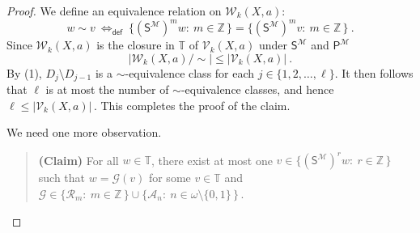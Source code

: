 \documentclass[10pt,a4paper, openany,  oldfontcommands]{memoir}
\newtheorem{open problem} [theorem] {Open Problem}
\newtheorem{open question} [theorem] {Open Question}
\renewcommand{\mathrm}{\mathsf}
\begin{document}
\begin{proof}
We define an equivalence relation on  $   \mathcal{W}_k   \left(     X,  a  \right)  $: 
\[
w  \sim  v  
\   \Leftrightarrow_{  \mathsf{def}  }    \   
\big\{  \left(  \mathrm{S}^{  \mathcal{M} }  \right)^m   w :   \   m  \in  \mathbb{Z} \,  \rbrace  
= 
\big\{  \left(  \mathrm{S}^{  \mathcal{M} }  \right)^m   v  :   \   m  \in  \mathbb{Z} \,  \rbrace  
\        .
\]
Since  $    \mathcal{W}_k   \left(     X,  a  \right)   $  is the closure in $  \mathbb{T} $ of  $   \mathcal{V}_k   \left(     X,  a  \right)  $
under   $   \mathrm{S}^{  \mathcal{M} }    $   and  $   \mathrm{P}^{  \mathcal{M} }    $  
\[
\vert  \mathcal{W}_k   \left(     X,  a  \right)    /   \sim  \vert   \leq     \vert   \mathcal{V}_k   \left(     X,  a  \right)    \vert   
\          .
\]
By (1),   
$  D_j  \setminus  D_{ j-1}  $  is a $  \sim$-equivalence class     for  each  $  j  \in  \lbrace 1, 2,  \ldots ,  \ell  \rbrace  $. 
It then follows that  $  \ell $ is at most the number of  $  \sim $-equivalence classes, 
and hence    $   \ell   \leq   \vert   \mathcal{V}_k   \left(     X,  a  \right)    \vert    \,  $.
This completes the proof of the claim. 





We need one more observation. 


   \begin{quote} {\bf (Claim)} \;\;\;\;\;\;    
   For  all $  w  \in  \mathbb{T} $, there exist  at most one
     $  v  \in  \lbrace   \left(   \mathrm{S}^{  \mathcal{M}  }  \right)^r   w :   \   r  \in  \mathbb{Z}   \,   \rbrace   $  
   such that   $  w  =  \mathcal{G} \left( v  \right)  $  for some  
   $  v  \in  \mathbb{T}  $  and   
   $    \mathcal{G}  \in    \lbrace  \mathcal{R}_m  :   \   m  \in  \mathbb{Z}  \,   \rbrace    \cup  
  \lbrace  \mathcal{A}_n   :   \   n  \in  \omega  \setminus  \lbrace 0,   1   \rbrace   \,   \rbrace        \,     $.
 \end{quote}  
 

\end{proof}
\end{document}
